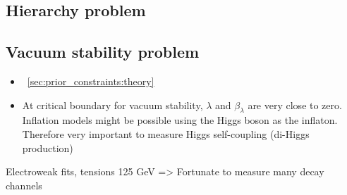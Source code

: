 
\subsection{Hierarchy problem}

\subsection{Vacuum stability problem}
\begin{itemize}
	\item \Section~\ref{sec:prior_constraints:theory}
	\item At critical boundary for vacuum stability, $\lambda$ and $\beta_{\lambda}$ are very close to zero. Inflation models might be possible using the Higgs boson as the inflaton. Therefore very important to measure Higgs self-coupling (\eg di-Higgs production)
\end{itemize}

Electroweak fits, tensions
125 GeV => Fortunate to measure many decay channels